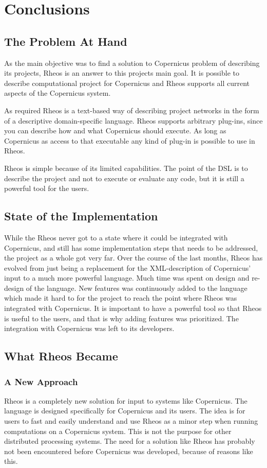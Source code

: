 \chapter{Conclusions}

\section{The Problem At Hand}
As the main objective was to find a solution to Copernicus problem of
describing its projects, Rheos is an answer to this projects main
goal. It is possible to describe computational project for Copernicus
and Rheos supports all current aspects of the Copernicus system.

As required Rheos is a text-based way of describing project networks
in the form of a descriptive domain-specific language. Rheos supports
arbitrary plug-ins, since you can describe how and what Copernicus
should execute. As long as Copernicus as access to that executable any
kind of plug-in is possible to use in Rheos.

Rheos is simple because of its limited capabilities. The point of the
DSL is to describe the project and not to execute or evaluate any
code, but it is still a powerful tool for the users.

\section{State of the Implementation}
While the Rheos never got to a state where it could be integrated with
Copernicus, and still has some implementation steps that needs to be
addressed, the project as a whole got very far. Over the course of the
last months, Rheos has evolved from just being a replacement for the
XML-description of Copernicus' input to a much more powerful
language. Much time was spent on design and re-design of the
language. New features was continuously added to the language which
made it hard to for the project to reach the point where Rheos was
integrated with Copernicus. It is important to have a powerful tool so
that Rheos is useful to the users, and that is why adding features was
prioritized. The integration with Copernicus was left to its
developers.

\section{What Rheos Became}

\subsection{A New Approach}
Rheos is a completely new solution for input to systems like
Copernicus. The language is designed specifically for Copernicus and
its users. The idea is for users to fast and easily understand and use
Rheos as a minor step when running computations on a Copernicus
system. This is not the purpose for other distributed processing
systems. The need for a solution like Rheos has probably not been
encountered before Copernicus was developed, because of reasons like
this.

